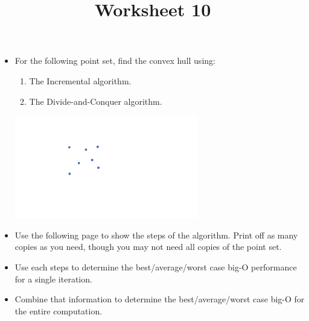 \documentclass[a4paper,12pt]{article}
\title{Worksheet 10}
\begin{document}
\maketitle

\worksheetGroundRules

\assignmentInstructions

\begin{itemize}


\item For the following point set, find the convex hull using:

\begin{enumerate}
	\item The Incremental algorithm. 
	\item The Divide-and-Conquer algorithm. 
\end{enumerate}

\vspace{-10pt}
\begin{center}
\includegraphics[width=8cm]{../images/chull.pdf}
\end{center}

\vspace{-10pt}
\item Use the following page to show the steps of the algorithm. Print off as many copies as you need, though you may not need all copies of the point set. 

\item Use each steps to determine the best/average/worst case big-O performance for a single iteration. 
\item Combine that information to determine the best/average/worst case big-O for the entire computation.



\end{itemize}


\worksheetSubmission




\newpage
\end{document}
